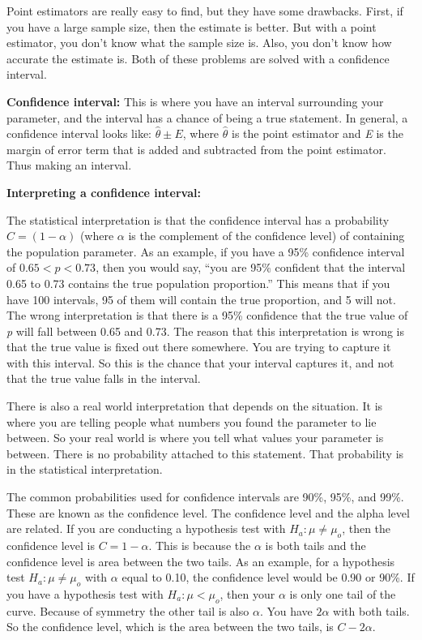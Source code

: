 \documentclass[
]{book}
\begin{document}
Point estimators are really easy to find, but they have some drawbacks. First, if you have a large sample size, then the estimate is better. But with a point estimator, you don't know what the sample size is. Also, you don't know how accurate the estimate is. Both of these problems are solved with a confidence interval.

\textbf{Confidence interval:} This is where you have an interval surrounding your parameter, and the interval has a chance of being a true statement. In general, a confidence interval looks like: \(\hat{\theta}\pm E\), where \(\hat{\theta}\) is the point estimator and \emph{E} is the margin of error term that is added and subtracted from the point estimator. Thus making an interval.

\textbf{Interpreting a confidence interval: }

The statistical interpretation is that the confidence interval has a probability \(C=(1-\alpha)\) (where \(\alpha\) is the complement of the confidence level) of containing the population parameter. As an example, if you have a 95\% confidence interval of \(0.65 < p < 0.73\), then you would say, ``you are 95\% confident that the interval 0.65 to 0.73 contains the true population proportion.'' This means that if you have 100 intervals, 95 of them will contain the true proportion, and 5 will not. The wrong interpretation is that there is a 95\% confidence that the true value of \emph{p} will fall between 0.65 and 0.73. The reason that this interpretation is wrong is that the true value is fixed out there somewhere. You are trying to capture it with this interval. So this is the chance that your interval captures it, and not that the true value falls in the interval.

There is also a real world interpretation that depends on the situation. It is where you are telling people what numbers you found the parameter to lie between. So your real world is where you tell what values your parameter is between. There is no probability attached to this statement. That probability is in the statistical interpretation.

The common probabilities used for confidence intervals are 90\%, 95\%, and 99\%. These are known as the confidence level. The confidence level and the alpha level are related. If you are conducting a hypothesis test with \(H_a:\mu\ne \mu_o\), then the confidence level is \(C=1-\alpha\). This is because the \(\alpha\) is both tails and the confidence level is area between the two tails. As an example, for a hypothesis test \(H_a:\mu\ne \mu_o\) with \(\alpha\) equal to 0.10, the confidence level would be 0.90 or 90\%. If you have a hypothesis test with \(H_a:\mu<\mu_o\), then your \(\alpha\) is only one tail of the curve. Because of symmetry the other tail is also \(\alpha\). You have \(2\alpha\) with both tails. So the confidence level, which is the area between the two tails, is \(C-2\alpha\).
\end{document}
